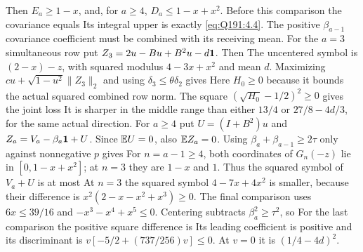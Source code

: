 Then $E_a\ge\allowbreak 1-x$, and, for $a\ge\allowbreak 4$, $D_a\le\allowbreak 1-x+x^2$. Before this
comparison the covariance equals
Its integral upper is exactly \eqref{eq:Q191:4.4}. The positive
$\beta_{a-1}$ covariance coefficient must be combined with its receiving mean.
For the $a=\allowbreak 3$ simultaneous row put $Z_3=\allowbreak 2u-Bu+B^2u-d\mathbf1$. Then
The uncentered symbol is $(2-x)-z$, with squared modulus $4-3x+x^2$
and mean $d$. Maximizing $cu+\sqrt{1-u^2}\|Z_3\|_2$ and using
$\delta_3\le\allowbreak \theta\delta_2$ gives
Here $H_0\ge\allowbreak 0$ because it bounds the actual squared combined row norm.
The square $(\sqrt{H_0}-1/2)^2\ge\allowbreak 0$ gives the joint loss
It is sharper in the middle range than either $13/4$ or $27/8-4d/3$,
for the same actual direction.
For $a\ge\allowbreak 4$ put $U=\allowbreak (I+B^2)u$ and $Z_a=\allowbreak V_a-\beta_a\mathbf1+U$.
Since $\mathbb E U=\allowbreak 0$, also $\mathbb E Z_a=\allowbreak 0$. Using
$\beta_a+\beta_{a-1}\ge\allowbreak 2\tau$ only against nonnegative $p$ gives
For $n=\allowbreak a-1\ge\allowbreak 4$, both coordinates of $G_n(-z)$ lie in
$[0,\allowbreak 1-x+x^2]$; at $n=\allowbreak 3$ they are $1-x$ and $1$. Thus the squared symbol
of $V_a+U$ is at most
At $n=\allowbreak 3$ the squared symbol $4-7x+4x^2$ is smaller, because their
difference is $x^2(2-x-x^2+x^3)\ge\allowbreak 0$. The final comparison uses
$6x\le\allowbreak 39/16$ and $-x^3-x^4+x^5\le\allowbreak 0$. Centering subtracts
$\beta_a^2\ge\allowbreak \tau^2$, so
For the last comparison the positive square difference is
Its leading coefficient is positive and its discriminant is
$v[-5/2+(737/256)v]\le\allowbreak 0$. At $v=\allowbreak 0$ it is $(1/4-4d)^2$.

